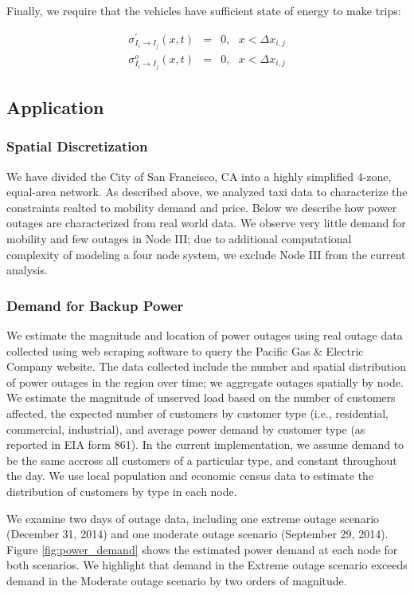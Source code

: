 \documentclass[journal]{IEEEtran}
\begin{document}
Finally, we require that the vehicles have sufficient state of energy to make trips:

\begin{eqnarray*}
    \sigma_{I_i \rightarrow I_j}^\prime(x,t) & = & 0, ~~~ x < \Delta x_{i,j} \\
    \sigma_{I_i \rightarrow I_j}^o(x,t) & = & 0, ~~~ x < \Delta x_{i,j}
\end{eqnarray*}

\subsection{Application}

\subsubsection{Spatial Discretization}
We have divided the City of San Francisco, CA into a highly simplified 4-zone, equal-area network. As described above, we analyzed taxi data to characterize the constraints realted to mobility demand and price. Below we describe how power outages are characterized from real world data. We observe very little demand for mobility and few outages in Node III; due to additional computational complexity of modeling a four node system, we exclude Node III from the current analysis.

\subsubsection{Demand for Backup Power}
We estimate the magnitude and location of power outages using real outage data collected using web scraping software to query the Pacific Gas \& Electric Company website. The data collected include the number and spatial distribution of power outages in the region over time; we aggregate outages spatially by node. We estimate the magnitude of unserved load based on the number of customers affected, the expected number of customers by customer type (i.e., residential, commercial, industrial), and average power demand by customer type (as reported in EIA form 861). In the current implementation, we assume demand to be the same accross all customers of a particular type, and constant throughout the day. We use local population and economic census data to estimate the distribution of customers by type in each node.

We examine two days of outage data, including one extreme outage scenario (December 31, 2014) and one moderate outage scenario (September 29, 2014). Figure \ref{fig:power_demand} shows the estimated power demand at each node for both scenarios. We highlight that demand in the Extreme outage scenario exceeds demand in the Moderate outage scenario by two orders of magnitude.
\end{document}
